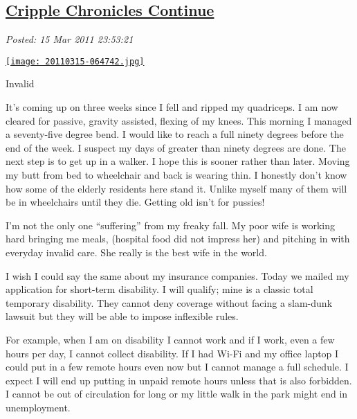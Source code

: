 %

\subsection*{\href{http://bakerjd99.wordpress.com/2011/03/15/cripple-chronicles-continue-2/}{Cripple Chronicles Continue}}


\noindent\emph{Posted: 15 Mar 2011 23:53:21}
\vspace{6pt}



\begin{floatingfigure}[r]{0.25\textwidth}
\centering
\href{http://bakerjd99.files.wordpress.com/2011/03/20110315-064742.jpg}{\texttt{[image: 20110315-064742.jpg]}}
\caption{Invalid}
\label{fig:1202X1}
\end{floatingfigure}It's coming up on three weeks since I fell and ripped my quadriceps. I
am now cleared for passive, gravity assisted, flexing of my knees. This
morning I managed a seventy-five degree bend. I would like to reach a
full ninety degrees before the end of the week. I suspect my days of
greater than ninety degrees are done. The next step is to get up in a
walker. I hope this is sooner rather than later. Moving my butt from bed
to wheelchair and back is wearing thin. I honestly don't know how some
of the elderly residents here stand it. Unlike myself many of them will
be in wheelchairs until they die. Getting old isn't for pussies!

I'm not the only one ``suffering'' from my freaky fall. My poor wife is
working hard bringing me meals, (hospital food did not impress her) and
pitching in with everyday invalid care. She really is the best wife in
the world.

I wish I could say the same about my insurance companies. Today we
mailed my application for short-term disability. I will qualify; mine is
a classic total temporary disability. They cannot deny coverage without
facing a slam-dunk lawsuit but they will be able to impose inflexible
rules.

For example, when I am on disability I cannot work and if I work, even a
few hours per day, I cannot collect disability. If I had Wi-Fi and my
office laptop I could put in a few remote hours even now but I cannot
manage a full schedule. I expect I will end up putting in unpaid remote
hours unless that is also forbidden. I cannot be out of circulation for
long or my little walk in the park might end in unemployment.



